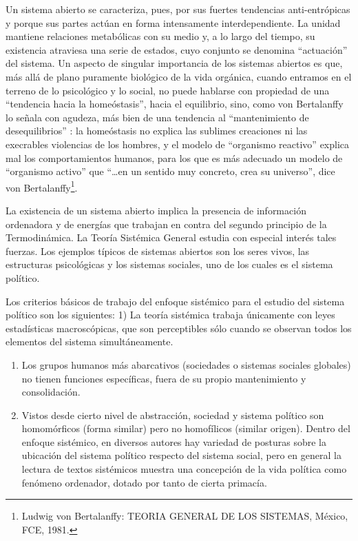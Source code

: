 \documentclass[
]{book}
\begin{document}
Un sistema abierto se caracteriza, pues, por sus fuertes tendencias anti-entrópicas y porque sus partes actúan en forma intensamente interdependiente. La unidad mantiene relaciones metabólicas con su medio y, a lo largo del tiempo, su existencia atraviesa una serie de estados, cuyo conjunto se denomina ``actuación'' del sistema. Un aspecto de singular importancia de los sistemas abiertos es que, más allá de plano puramente biológico de la vida orgánica, cuando entramos en el terreno de lo psicológico y lo social, no puede hablarse con propiedad de una ``tendencia hacia la homeóstasis'', hacia el equilibrio, sino, como von Bertalanffy lo señala con agudeza, más bien de una tendencia al ``mantenimiento de desequilibrios'' : la homeóstasis no explica las sublimes creaciones ni las execrables violencias de los hombres, y el modelo de ``organismo reactivo'' explica mal los comportamientos humanos, para los que es más adecuado un modelo de ``organismo activo'' que ``\ldots en un sentido muy concreto, crea su universo'', dice von Bertalanffy\footnote{Ludwig von Bertalanffy: TEORIA GENERAL DE LOS SISTEMAS, México, FCE, 1981.}.

La existencia de un sistema abierto implica la presencia de información ordenadora y de energías que trabajan en contra del segundo principio de la Termodinámica. La Teoría Sistémica General estudia con especial interés tales fuerzas. Los ejemplos típicos de sistemas abiertos son los seres vivos, las estructuras psicológicas y los sistemas sociales, uno de los cuales es el sistema político.

Los criterios básicos de trabajo del enfoque sistémico para el estudio del sistema político son los siguientes: 1) La teoría sistémica trabaja únicamente con leyes estadísticas macroscópicas, que son perceptibles sólo cuando se observan todos los elementos del sistema simultáneamente.

\begin{enumerate}
\def\labelenumi{\arabic{enumi})}
\setcounter{enumi}{1}
\item
  Los grupos humanos más abarcativos (sociedades o sistemas sociales globales) no tienen funciones específicas, fuera de su propio mantenimiento y consolidación.
\item
  Vistos desde cierto nivel de abstracción, sociedad y sistema político son homomórficos (forma similar) pero no homofílicos (similar origen). Dentro del enfoque sistémico, en diversos autores hay variedad de posturas sobre la ubicación del sistema político respecto del sistema social, pero en general la lectura de textos sistémicos muestra una concepción de la vida política como fenómeno ordenador, dotado por tanto de cierta primacía.
\end{enumerate}
\end{document}
